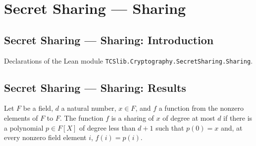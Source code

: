 \section{Secret Sharing --- Sharing}
\subsection*{Secret Sharing --- Sharing: Introduction}

Declarations of the Lean module \texttt{TCSlib.Cryptography.SecretSharing.Sharing}.

\subsection*{Secret Sharing --- Sharing: Results}

\begin{definition}
\label{TCSlib.Shamir.IsSharing}
\leanok
{}
Let $F$ be a field, $d$ a natural number, $x\in F$, and $f$ a function from the nonzero
elements of $F$ to $F$. The function $f$ is a sharing of $x$ of degree at most $d$ if
there is a polynomial $p\in F[X]$ of degree less than $d+1$ such that $p(0)=x$ and, at
every nonzero field element $i$, $f(i)=p(i)$.
\end{definition}

